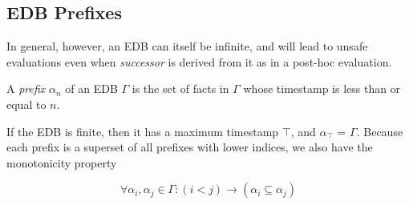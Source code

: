 





\subsection{EDB Prefixes}

In general, however, an EDB can itself be infinite, and will lead to unsafe evaluations even when \emph{successor} is derived from it
as in a post-hoc evaluation.

\begin{definition}
A \emph{prefix} $\alpha_{n}$ of an EDB $\Gamma$ is the set of facts in $\Gamma$ whose timestamp is less than or equal to $n$.
\end{definition}

If the EDB is finite, then it has a maximum timestamp $\top$, and $\alpha_{\top}$ = $\Gamma$.  Because each prefix is a superset of all 
prefixes with lower indices, we also have the monotonicity property

\begin{equation}
\forall \alpha_{i}, \alpha_{j} \in \Gamma : (i < j) \to (\alpha_{i} \subseteq \alpha_{j})
\end{equation}



